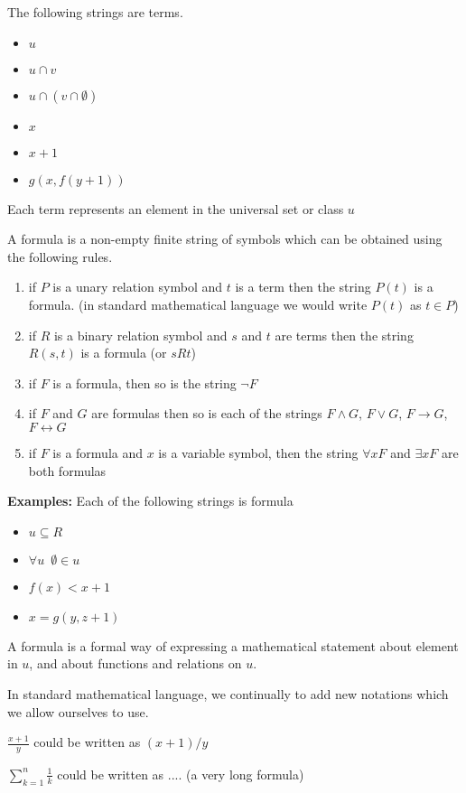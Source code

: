 \begin{exmp}

The following strings are terms.
\begin{itemize}
\item $u$
\item $u\cap v$
\item $u\cap (v \cap \emptyset)$
\item $x$
\item $x+1$
\item $g(x,f(y+1))$
\end{itemize}

Each term represents an element in the universal set or class $u$

\end{exmp}

\begin{defn}
A formula is a non-empty finite string of symbols which can be obtained using the following rules.
\end{defn}
\begin{enumerate}
\item if $P$ is a unary relation symbol and $t$ is a term then the string $P(t)$ is a formula. (in standard mathematical language we would write $P(t)$ as $t\in P$)
\item if $R$ is a binary relation symbol and $s$ and $t$ are terms then the string $R(s,t)$ is a formula (or $sRt$)
\item if $F$ is a formula, then so is the string $\neg F$
\item if $F$ and $G$ are formulas then so is each of the strings $F\wedge G$, $F\vee G$, $F\to G$, $F\leftrightarrow G$
\item if $F$ is a formula and $x$ is a variable symbol, then the string $\forall x F$ and $\exists x F$ are both formulas
\end{enumerate}

\textbf{Examples: }
Each of the following strings is formula
\begin{itemize}
\item $u\subseteq R$
\item $\forall u \enspace \emptyset \in u$
\item $f(x)<x+1$
\item $x=g(y,z+1)$
\end{itemize}

A formula is a formal way of expressing a mathematical statement about element in $u$, and about functions and relations on $u$.


\begin{rem}
In standard mathematical language, we continually to add new notations which we allow ourselves to use.
\end{rem}

\begin{exmp}

$\displaystyle\frac{x+1}{y}$ could be written as $(x+1)/y$

$\displaystyle\sum_{k=1}^n \frac{1}{k}$ could be written as .... (a very long formula)
\end{exmp}

